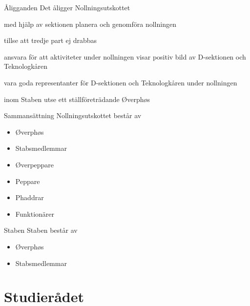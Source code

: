 \documentclass[pdfbookmarks,a4paper,11pt]{article}
\newlength{\itemcollength}
\newenvironment{reglemlista}{%
  \begin{list}{}{%
      \setlength{\labelwidth}{\itemcollength}%
      \setlength{\leftmargin}{\labelwidth + \labelsep}%
      \renewcommand{\makelabel}[1]{%
        \raisebox{0pt}[1ex][0pt]{%
          \makebox[\labelwidth][l]{%
            \parbox[t]{\itemcollength}{%
              \raggedright\hspace{0pt}##1}}}\hfill}%
      }}{%
  \end{list}}
\begin{document}
\begin{reglemlista}

	\item[Åligganden]
	Det åligger Nollningsutskottet
	\begin{attlista}
		\item med hjälp av sektionen planera och genomföra nollningen
		\item tillse att tredje part ej drabbas
		\item ansvara för att aktiviteter under nollningen visar positiv bild av D-sektionen och Teknologkåren
		\item vara goda representanter för D-sektionen och Teknologkåren under nollningen
		\item inom Staben utse ett ställföreträdande Øverphøs
	\end{attlista}

	\item[Sammansättning]
	Nollningsutskottet består av
	\begin{itemize}
		\item Øverphøs
		\item Stabsmedlemmar
		\item \O verpeppare
		\item Peppare
		\item Phaddrar
        \item Funktionärer
	\end{itemize}

	\item[Staben]
	Staben består av
	\begin{itemize}
		\item Øverphøs
		\item Stabsmedlemmar
	\end{itemize}

\end{reglemlista}

\section{Studierådet}
\end{document}
